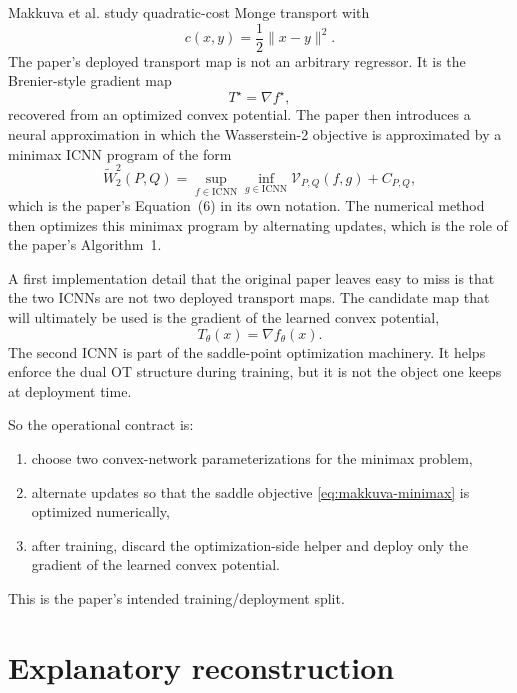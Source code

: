 \documentclass[11pt]{report}
\begin{document}
Makkuva et al. study quadratic-cost Monge transport with
\begin{equation}
c(x,y)=\frac12\|x-y\|^2.
\label{eq:makkuva-cost}
\end{equation}
The paper's deployed transport map is not an arbitrary regressor.  It is the
Brenier-style gradient map
\begin{equation}
T^\star = \nabla f^{\star},
\label{eq:makkuva-gradient-map}
\end{equation}
recovered from an optimized convex potential.  The paper then introduces a neural
approximation in which the Wasserstein-2 objective is approximated by a minimax
ICNN program of the form
\begin{equation}
\widetilde W_2^2(P,Q)
=
\sup_{f\in\mathrm{ICNN}}\inf_{g\in\mathrm{ICNN}} \mathcal V_{P,Q}(f,g)+C_{P,Q},
\label{eq:makkuva-minimax}
\end{equation}
which is the paper's Equation~(6) in its own notation.  The numerical method then
optimizes this minimax program by alternating updates, which is the role of the
paper's Algorithm~1.

A first implementation detail that the original paper leaves easy to miss is that
the two ICNNs are not two deployed transport maps.  The candidate map that will
ultimately be used is the gradient of the learned convex potential,
\begin{equation}
T_{\theta}(x)=\nabla f_{\theta}(x).
\label{eq:makkuva-deployed-icnn-map}
\end{equation}
The second ICNN is part of the saddle-point optimization machinery.  It helps
enforce the dual OT structure during training, but it is not the object one keeps
at deployment time.

So the operational contract is:
\begin{enumerate}[label=(\roman*)]
  \item choose two convex-network parameterizations for the minimax problem,
  \item alternate updates so that the saddle objective \eqref{eq:makkuva-minimax}
  is optimized numerically,
  \item after training, discard the optimization-side helper and deploy only the
  gradient of the learned convex potential.
\end{enumerate}
This is the paper's intended training/deployment split.

\section{Explanatory reconstruction}
\end{document}
